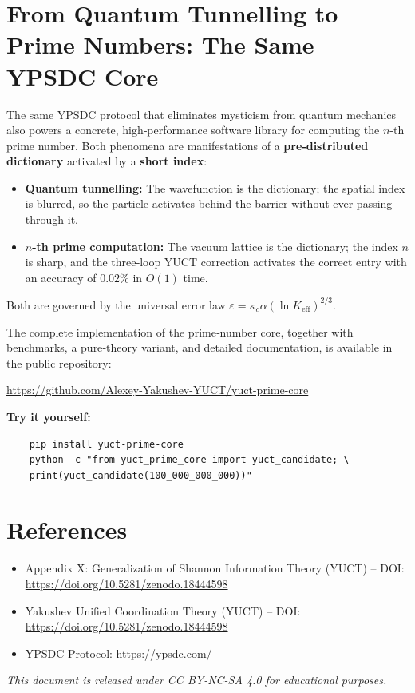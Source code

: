 \documentclass[12pt,a4paper]{article}
\begin{document}
\section{From Quantum Tunnelling to Prime Numbers: The Same YPSDC Core}

The same YPSDC protocol that eliminates mysticism from quantum
mechanics also powers a concrete, high‑performance software library
for computing the $n$-th prime number.  Both phenomena are
manifestations of a \textbf{pre‑distributed dictionary} activated by a
\textbf{short index}:

\begin{itemize}
	\item \textbf{Quantum tunnelling:} The wavefunction is the
	dictionary; the spatial index is blurred, so the particle
	activates behind the barrier without ever passing through it.
	\item \textbf{$n$-th prime computation:} The vacuum lattice is the
	dictionary; the index $n$ is sharp, and the three‑loop YUCT
	correction activates the correct entry with an accuracy of
	$0.02\%$ in $O(1)$ time.
\end{itemize}

Both are governed by the universal error law
$\varepsilon = \kappa_c\alpha(\ln K_{\mathrm{eff}})^{2/3}$.

The complete implementation of the prime‑number core, together with
benchmarks, a pure‑theory variant, and detailed documentation, is
available in the public repository:

\begin{center}
	\url{https://github.com/Alexey-Yakushev-YUCT/yuct-prime-core}
\end{center}

\textbf{Try it yourself:}
\begin{verbatim}
	pip install yuct-prime-core
	python -c "from yuct_prime_core import yuct_candidate; \
	print(yuct_candidate(100_000_000_000))"
\end{verbatim}

	\section{References}
	
	\begin{itemize}
		\item Appendix X: Generalization of Shannon Information Theory (YUCT) -- DOI: \url{https://doi.org/10.5281/zenodo.18444598}
		\item Yakushev Unified Coordination Theory (YUCT) -- DOI: \url{https://doi.org/10.5281/zenodo.18444598}
		\item YPSDC Protocol: \url{https://ypsdc.com/}
	\end{itemize}
	
	\noindent\textit{This document is released under CC BY-NC-SA 4.0 for educational purposes.}
	
\end{document}
